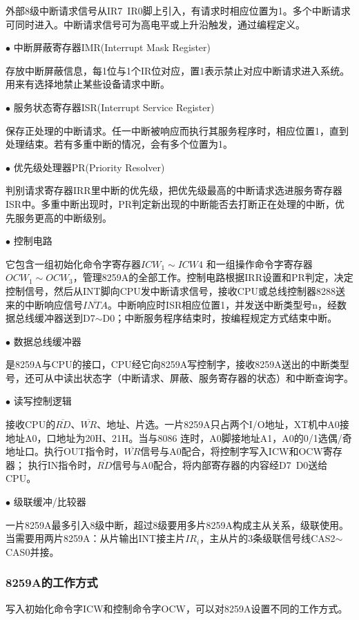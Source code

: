 \documentclass[UTF8,12pt]{ctexart}
\begin{document}
    外部8级中断请求信号从IR7~IR0脚上引入，有请求时相应位置为1。多个中断请求可同时进入。中断请求信号可为高电平或上升沿触发，通过编程定义。
    
    $\bullet$ 中断屏蔽寄存器IMR(Interrupt Mask Register)
    
    存放中断屏蔽信息，每1位与1个IR位对应，置1表示禁止对应中断请求进入系统。用来有选择地禁止某些设备请求中断。
    
    $\bullet$ 服务状态寄存器ISR(Interrupt Service Register)
    
    保存正处理的中断请求。任一中断被响应而执行其服务程序时，相应位置1，直到处理结束。若有多重中断的情况，会有多个位置为1。
    
    $\bullet$ 优先级处理器PR(Priority Resolver)
    
    判别请求寄存器IRR里中断的优先级，把优先级最高的中断请求选进服务寄存器ISR中。多重中断出现时，PR判定新出现的中断能否去打断正在处理的中断，优先服务更高的中断级别。
    
    $\bullet$ 控制电路
    
    它包含一组初始化命令字寄存器$ICW_1 \sim  ICW4$ 和一组操作命令字寄存器$OCW_1 \sim OCW_3$，管理8259A的全部工作。控制电路根据IRR设置和PR判定，决定控制信号，然后从INT脚向CPU发中断请求信号，接收CPU或总线控制器8288送来的中断响应信号$\overline{INTA}$。中断响应时ISR相应位置1，并发送中断类型号n，经数据总线缓冲器送到D7$\sim$D0；中断服务程序结束时，按编程规定方式结束中断。
    
    $\bullet$ 数据总线缓冲器
    
    是8259A与CPU的接口，CPU经它向8259A写控制字，接收8259A送出的中断类型号，还可从中读出状态字（中断请求、屏蔽、服务寄存器的状态）和中断查询字。
    
    $\bullet$ 读写控制逻辑
    
    接收CPU的$\overline{RD}$、$\overline{WR}$、地址、片选。一片8259A只占两个I/O地址，XT机中A0接地址A0，口地址为20H、21H。当与8086 连时，A0脚接地址A1，A0的0/1选偶/奇地址口。执行OUT指令时，$\overline{WR}$信号与A0配合，将控制字写入ICW和OCW寄存器；
    执行IN指令时，$\overline{RD}$信号与A0配合，将内部寄存器的内容经D7~D0送给CPU。
    
    $\bullet$ 级联缓冲/比较器
    
    一片8259A最多引入8级中断，超过8级要用多片8259A构成主从关系，级联使用。当需要用两片8259A：从片输出INT接主片$IR_i$，主从片的3条级联信号线CAS2$\sim$CAS0并接。
    
    \subsubsection{8259A的工作方式}
    写入初始化命令字ICW和控制命令字OCW，可以对8259A设置不同的工作方式。
    
\end{document}
